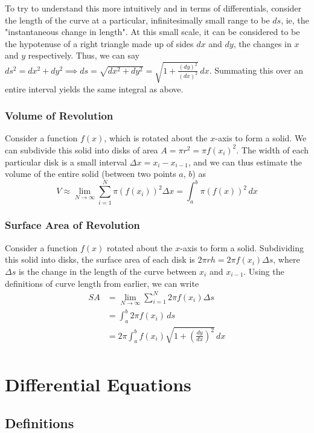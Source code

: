 \documentclass[12pt]{article}
\begin{document}
To try to understand this more intuitively and in terms of differentials, consider the length of the curve at a particular, infinitesimally small range to be $ds$, ie, the "instantaneous change in length". At this small scale, it can be considered to be the hypotenuse of a right triangle made up of sides $dx$ and $dy$, the changes in $x$ and $y$ respectively. Thus, we can say $ds^2 = dx^2 + dy^2 \implies ds = \sqrt{dx^2 + dy^2} = \sqrt{1 + \frac{(dy)^2}{(dx)^2}}\,dx$. Summating this over an entire interval yields the same integral as above.

\subsubsection{Volume of Revolution}
Consider a function $f(x)$, which is rotated about the $x$-axis to form a solid. We can subdivide this solid into disks of area $A = \pi r^2 = \pi f(x_i)^2$. The width of each particular disk is a small interval $\Delta x = x_i - x_{i - 1}$, and we can thus estimate the volume of the entire solid (between two points $a$, $b$) as \[V \approx \lim_{N \to \infty} \sum_{i = 1}^{N} \pi (f(x_i))^2 \Delta x = \int_a^b \pi (f(x))^2 \,dx\]

\subsubsection{Surface Area of Revolution}
Consider a function $f(x)$ rotated about the $x$-axis to form a solid. Subdividing this solid into disks, the surface area of each disk is $2 \pi r h = 2\pi f(x_i) \Delta s$, where $\Delta s$ is the change in the length of the curve between $x_i$ and $x_{i-1}$. Using the definitions of curve length from earlier, we can write \begin{align*}
    SA &= \lim_{N \to \infty} \sum_{i =1}^N 2 \pi f(x_i) \Delta s \\
    &= \int_a^b 2 \pi f(x_i) \,ds \\
    &= 2 \pi \int_a^b f(x_i) \sqrt{1 + (\frac{dy}{dx})^2} \,dx\\
\end{align*}

\section{Differential Equations}
\subsection{Definitions}
\end{document}
